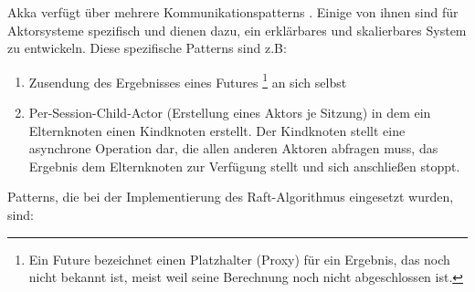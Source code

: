 Akka verfügt über mehrere Kommunikationspatterns \cite{akka}. Einige von ihnen sind für Aktorsysteme spezifisch und dienen dazu, ein erklärbares und skalierbares System zu entwickeln. Diese spezifische Patterns sind z.B:

\begin{enumerate}
	\item Zusendung des Ergebnisses eines Futures \footnote{Ein Future bezeichnet einen Platzhalter (Proxy) für ein Ergebnis, das noch nicht bekannt ist, meist weil seine Berechnung noch nicht abgeschlossen ist.} an sich selbst
	
	\item Per-Session-Child-Actor (Erstellung eines Aktors je Sitzung) in dem ein Elternknoten einen Kindknoten erstellt. Der Kindknoten stellt eine asynchrone Operation dar, die allen anderen Aktoren abfragen muss, das Ergebnis dem Elternknoten zur Verfügung stellt und sich anschließen stoppt.
\end{enumerate}

Patterns, die bei der Implementierung des Raft-Algorithmus eingesetzt wurden, sind:

